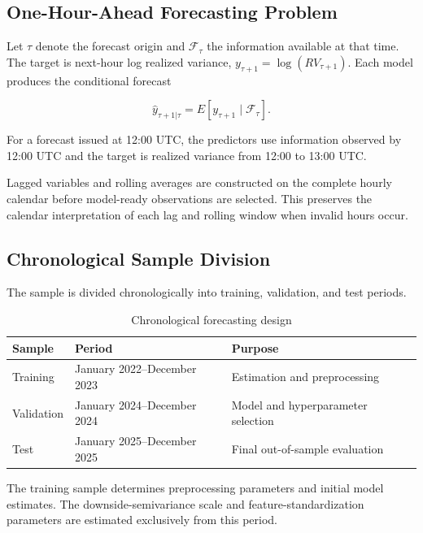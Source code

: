 \subsection{One-Hour-Ahead Forecasting Problem}

Let \(\tau\) denote the forecast origin and
\(\mathcal{F}_{\tau}\) the information available at that time.
The target is next-hour log realized variance,
\(y_{\tau+1}=\log(RV_{\tau+1})\). Each model produces the
conditional forecast

\begin{equation}
\widehat{y}_{\tau+1|\tau}
=
E
\left[
y_{\tau+1}
\mid
\mathcal{F}_{\tau}
\right].
\label{eq:forecast-objective}
\end{equation}

For a forecast issued at 12:00 UTC, the predictors use
information observed by 12:00 UTC and the target is realized
variance from 12:00 to 13:00 UTC.

Lagged variables and rolling averages are constructed on the
complete hourly calendar before model-ready observations are
selected. This preserves the calendar interpretation of each
lag and rolling window when invalid hours occur.

\subsection{Chronological Sample Division}

The sample is divided chronologically into training,
validation, and test periods.

\begin{table}[H]
\centering
\caption{Chronological forecasting design}
\label{tab:forecasting-splits}
\begin{tabular}{lll}
\toprule
Sample & Period & Purpose \\
\midrule
Training
& January 2022--December 2023
& Estimation and preprocessing \\

Validation
& January 2024--December 2024
& Model and hyperparameter selection \\

Test
& January 2025--December 2025
& Final out-of-sample evaluation \\
\bottomrule
\end{tabular}
\end{table}

The training sample determines preprocessing parameters and
initial model estimates. The downside-semivariance scale and
feature-standardization parameters are estimated exclusively
from this period.

